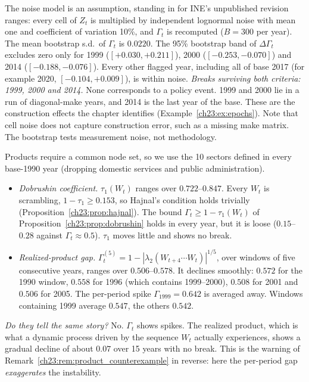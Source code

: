 \documentclass[../solutions_manual.tex]{subfiles}
\begin{document}
 The noise model is an assumption, standing in for INE's unpublished revision ranges: every cell of $Z_t$ is multiplied by independent lognormal noise with mean one and coefficient of variation 10\%, and $\Gamma_t$ is recomputed ($B = 300$ per year). The mean bootstrap s.d.\ of $\Gamma_t$ is $0.0220$. The 95\% bootstrap band of $\Delta\Gamma_t$ excludes zero only for 1999 ($[+0.030, +0.211]$), 2000 ($[-0.253, -0.070]$) and 2014 ($[-0.188, -0.076]$). Every other flagged year, including all of base 2017 (for example 2020, $[-0.104, +0.009]$), is within noise. \emph{Breaks surviving both criteria: 1999, 2000 and 2014.} None corresponds to a policy event. 1999 and 2000 lie in a run of diagonal-make years, and 2014 is the last year of the base. These are the construction effects the chapter identifies (Example~\ref{ch23:ex:epochs}). Note that cell noise does not capture construction error, such as a missing make matrix. The bootstrap tests measurement noise, not methodology.

 Products require a common node set, so we use the 10 sectors defined in every base-1990 year (dropping domestic services and public administration).
\begin{itemize}
\item \emph{Dobrushin coefficient.} $\tau_1(W_t)$ ranges over $0.722$--$0.847$. Every $W_t$ is scrambling, $1 - \tau_1 \ge 0.153$, so Hajnal's condition holds trivially (Proposition~\ref{ch23:prop:hajnal}). The bound $\Gamma_t \ge 1 - \tau_1(W_t)$ of Proposition~\ref{ch23:prop:dobrushin} holds in every year, but it is loose ($0.15$--$0.28$ against $\Gamma_t \approx 0.5$). $\tau_1$ moves little and shows no break.
\item \emph{Realized-product gap.} $\Gamma^{(5)}_t = 1 - |\lambda_2(W_{t+4}\cdots W_t)|^{1/5}$, over windows of five consecutive years, ranges over $0.506$--$0.578$. It declines smoothly: $0.572$ for the 1990 window, $0.558$ for 1996 (which contains 1999--2000), $0.508$ for 2001 and $0.506$ for 2005. The per-period spike $\Gamma_{1999} = 0.642$ is averaged away. Windows containing 1999 average $0.547$, the others $0.542$.
\end{itemize}
\emph{Do they tell the same story?} No. $\Gamma_t$ shows spikes. The realized product, which is what a dynamic process driven by the sequence $W_t$ actually experiences, shows a gradual decline of about $0.07$ over 15 years with no break. This is the warning of Remark~\ref{ch23:rem:product_counterexample} in reverse: here the per-period gap \emph{exaggerates} the instability.
\end{document}
